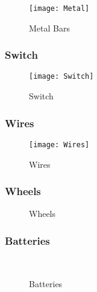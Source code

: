 \documentclass[12pt]{article}
\begin{document}
\begin{figure}[H]
	\centering
	\texttt{[image: Metal]}
	\caption{Metal Bars} \label{fig:metal}
\end{figure}

\subsubsection*{Switch} \label{subsub:switch}

\begin{figure}[H]
	\centering
	\texttt{[image: Switch]}
	\caption{Switch} \label{fig:switch}
\end{figure}

\subsubsection*{Wires} \label{subsub:wires}

\begin{figure}[H]
	\centering
	\texttt{[image: Wires]}
	\caption{Wires} \label{fig:wires}
\end{figure}

\subsubsection*{Wheels} \label{subsub:wheels}

\begin{figure}[H]
	\centering
	 \hspace{0.5cm}
	\caption{Wheels} \label{fig:wheels}
\end{figure}

\subsubsection*{Batteries} \label{subsub:batteries}

\begin{figure}[H]
	\centering
	 \hspace{0.5cm}
	 \\ \vspace{0.5cm}
	\caption{Batteries} \label{fig:batteries}
\end{figure}
\end{document}
